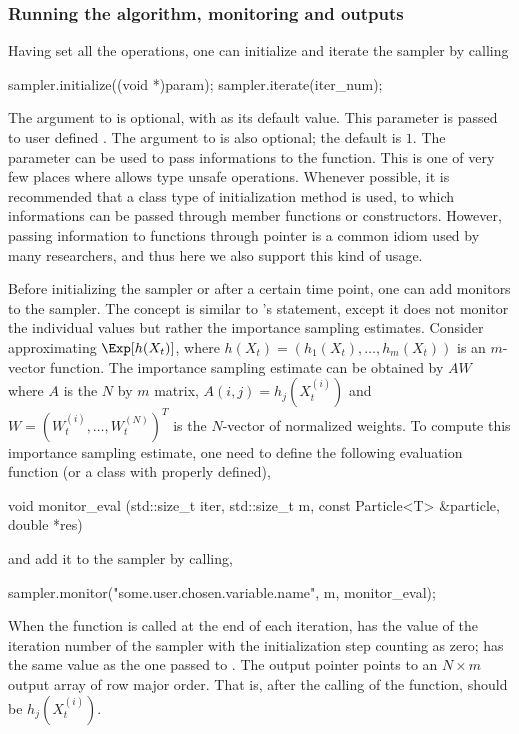 \documentclass[11pt, fontset=Minion, showoverfull,
bib, biblatexstyle=numeric, mintcode, minted=cache]{marticle}
\begin{document}
\subsubsection{Running the algorithm, monitoring and outputs}

Having set all the operations, one can initialize and iterate the sampler by
calling
\begin{cppcode}
sampler.initialize((void *)param);
sampler.iterate(iter_num);
\end{cppcode}
The  argument to  is optional, with
 as its default value. This parameter is passed to user
defined . The  argument to
 is also optional; the default is $1$. The
 parameter can be used to pass informations to the
 function. This is one of very few places where \vsmc
allows type unsafe operations. Whenever possible, it is recommended that a
class type of initialization method is used, to which informations can be
passed through member functions or constructors. However, passing information
to functions through  pointer is a common idiom used by many
researchers, and thus here we also support this kind of usage.

Before initializing the sampler or after a certain time point, one can add
monitors to the sampler. The concept is similar to \cbugs's
 statement, except it does not monitor the individual
values but rather the importance sampling estimates. Consider approximating
$\Exp[h(X_t)]$, where $h(X_t) = (h_1(X_t),\dots,h_m(X_t))$ is an $m$-vector
function. The importance sampling estimate can be obtained by $AW$ where $A$
is the $N$ by $m$ matrix, $A(i,j) = h_j(X_t^{(i)})$ and $W =
(W_t^{(i)},\dots,W_t^{(N)})^T$ is the $N$-vector of normalized weights. To
compute this importance sampling estimate, one need to define the following
evaluation function (or a class with  properly defined),
\begin{cppcode}
void monitor_eval (std::size_t iter, std::size_t m,
        const Particle<T> &particle, double *res)
\end{cppcode}
and add it to the sampler by calling,
\begin{cppcode}
sampler.monitor("some.user.chosen.variable.name", m, monitor_eval);
\end{cppcode}
When the function  is called at the end of each
iteration,  has the value of the iteration number of the
sampler with the initialization step counting as zero;  has the
same value as the one passed to . The output
pointer  points to an $N \times m$ output array of row major
order. That is, after the calling of the function,
 should be $h_j(X_t^{(i)})$.
\end{document}
